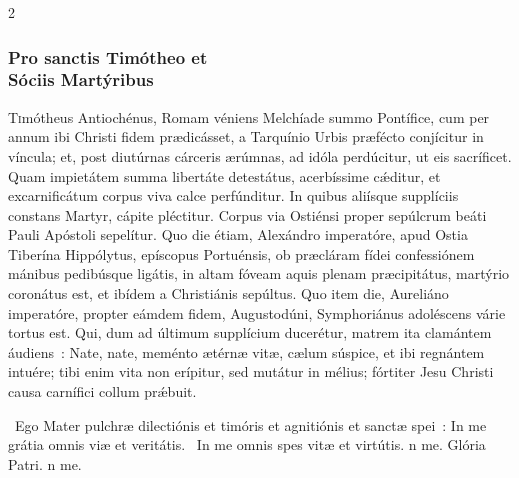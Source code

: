 \documentclass[9pt,twoside]{extarticle}
\begin{document}
\begin{multicols}{2}
\subsubsection*{\center \normalfont Pro sanctis Timótheo et\\ Sóciis Martýribus\\
}
\lettrine{T}imótheus Antiochénus, Romam véniens Melchíade summo Pontífice, cum per annum ibi Christi fidem prædicásset, a Tarquínio Urbis præfécto conjícitur in víncula; et, post diutúrnas cárceris ærúmnas, ad idóla perdúcitur, ut eis sacríficet. Quam impietátem summa libertáte detestátus, acerbíssime cǽditur, et excarnificátum corpus viva calce perfúnditur. In quibus aliísque supplíciis constans Martyr, cápite pléctitur. Corpus via Ostiénsi proper sepúlcrum beáti Pauli Apóstoli sepelítur. Quo die étiam, Alexándro imperatóre, apud Ostia Tiberína Hippólytus, epíscopus Portuénsis, ob præcláram fídei confessiónem mánibus pedibúsque ligátis, in altam fóveam aquis plenam præcipitátus, martýrio coronátus est, et ibídem a Christiánis sepúltus. Quo item die, Aureliáno imperatóre, propter eámdem fidem, Augustodúni, Symphoriánus adoléscens várie tortus est. Qui, dum ad últimum supplícium ducerétur, matrem ita clamántem áudiens~: Nate, nate, meménto ætérnæ vitæ, cælum súspice, et ibi regnántem intuére; tibi enim vita non erípitur, sed mutátur in mélius; fórtiter Jesu Christi causa carnífici collum prǽbuit.



~Ego Mater pulchræ dilectiónis et timóris et agnitiónis et sanctæ spei~: \textred{*} In me grátia omnis viæ et veritátis. ~In me omnis spes vitæ et virtútis. n me. Glória Patri. n me.


\end{multicols}
\end{document}
